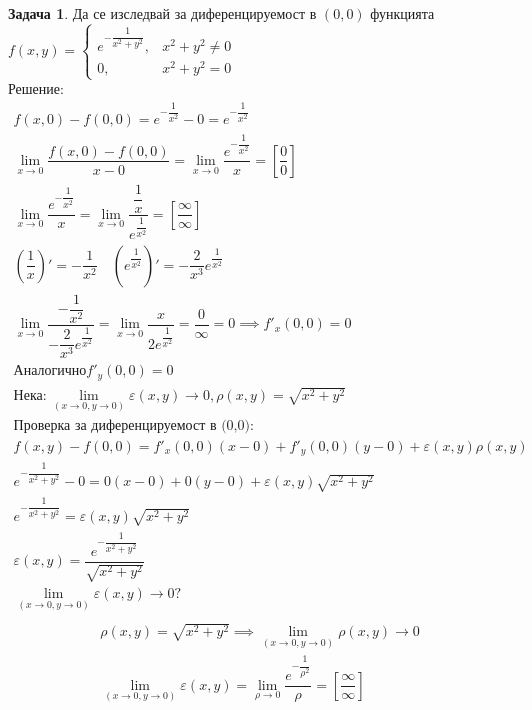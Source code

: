 \documentclass[a4paper,fleqn,12pt]{article}
\theoremstyle{definition}
\newtheorem{task}{Задача}[subsection]
\begin{document}
\begin{task}
Да се изследвай за диференцируемост в $(0,0)$ функцията 
$f(x,y) = 
\begin{cases}
e^{- \dfrac{1}{x^2 + y^2}}, & x^2 + y^2 \neq 0 \\
0, & x^2 + y^2 = 0
\end{cases}
$\\
Решение: 
\begin{gather*}
f(x,0) - f(0,0) = e^{- \dfrac{1}{x^2}} - 0 = e^{- \dfrac{1}{x^2}}\\
\lim\limits_{x \to 0} \dfrac{f(x,0) - f(0,0)}{x - 0}= \lim\limits_{x \to 0} \dfrac{e^{- \dfrac{1}{x^2}}}{x} = \left[ \dfrac{0}{0}\right]\\
\lim\limits_{x \to 0} \dfrac{e^{- \dfrac{1}{x^2}}}{x} = \lim\limits_{x \to 0} \dfrac{\dfrac{1}{x}}{e^{\dfrac{1}{x^2}}} = \left[ \dfrac{\infty}{\infty}\right] \\
\left( \dfrac{1}{x} \right)' = -\dfrac{1}{x^2} \quad \left( e^{\dfrac{1}{x^2}} \right)' = -\dfrac{2}{x^3} e^{\dfrac{1}{x^2}}\\
\lim\limits_{x \to 0} \dfrac{-\dfrac{1}{x^2}}{-\dfrac{2}{x^3} e^{\dfrac{1}{x^2}}} = \lim\limits_{x \to 0} \dfrac{x}{2e^{\dfrac{1}{x^2}}} = \dfrac{0}{\infty} = 0 \implies f'_x(0,0) = 0\\
\text{Аналогично} f'_y(0,0) = 0\\
\text{Нека}: \lim\limits_ {(x \to 0, y \to 0)} \varepsilon (x,y) \to 0, \rho (x,y) = \sqrt{x^2 + y^2}\\
\text{Проверка за диференцируемост в (0,0):}\\
f(x,y) - f(0,0)  = f'_x(0,0)(x - 0) + f'_y(0,0)(y-0) + \varepsilon (x,y) \rho (x,y) \\
e^{- \dfrac{1}{x^2 + y^2}} - 0 = 0(x-0) + 0(y-0) + \varepsilon (x,y)\sqrt{x^2 + y^2}\\
e^{- \dfrac{1}{x^2 + y^2}} = \varepsilon (x,y)\sqrt{x^2 + y^2}\\
\varepsilon (x,y) = \dfrac{e^{- \dfrac{1}{x^2 + y^2}}}{\sqrt{x^2 + y^2}}\\
\lim\limits_ {(x \to 0, y \to 0)} \varepsilon (x,y) \to 0?\\
\end{gather*}
\begin{gather*}
\rho (x,y) = \sqrt{x^2 + y^2} \implies \lim\limits_ {(x \to 0, y \to 0)}\rho (x,y) \to 0 \\
\lim\limits_ {(x \to 0, y \to 0)} \varepsilon (x,y) = \lim\limits_ {\rho \to 0} \dfrac{e^{- \dfrac{1}{\rho^2}}}{\rho} = \left[ \dfrac{\infty}{\infty}\right]\\

\end{gather*}
\end{task}
\end{document}
